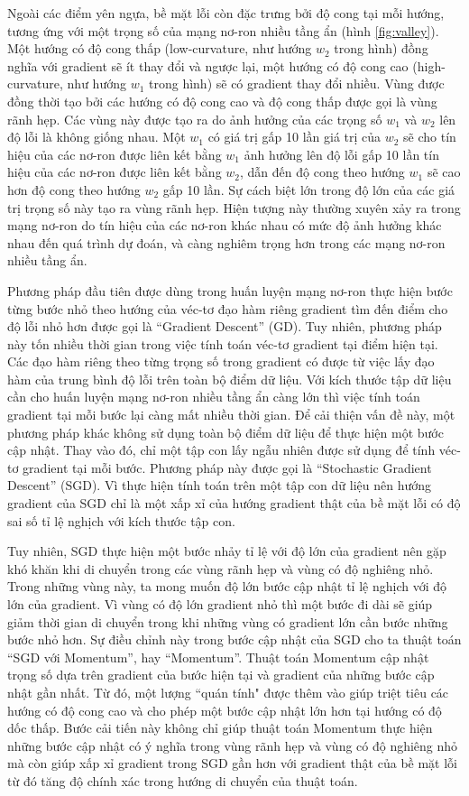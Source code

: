 Ngoài các điểm yên ngựa, bề mặt lỗi còn đặc trưng bởi độ cong tại mỗi hướng, tương ứng với một trọng số của mạng nơ-ron nhiều tầng ẩn (hình \ref{fig:valley}). Một hướng có độ cong thấp (low-curvature, như hướng $w_2$ trong hình) đồng nghĩa với gradient sẽ ít thay đổi và ngược lại, một hướng có độ cong cao (high-curvature, như hướng $w_1$ trong hình) sẽ có gradient thay đổi nhiều. Vùng được đồng thời tạo bởi các hướng có độ cong cao và độ cong thấp được gọi là vùng rãnh hẹp. Các vùng này được tạo ra do ảnh hưởng của các trọng số $w_1$ và $w_2$ lên độ lỗi là không giống nhau. Một $w_1$ có giá trị gấp 10 lần giá trị của $w_2$ sẽ cho tín hiệu của các nơ-ron được liên kết bằng $w_1$ ảnh hưởng lên độ lỗi gấp 10 lần tín hiệu của các nơ-ron được liên kết bằng $w_2$, dẫn đến độ cong theo hướng $w_1$ sẽ cao hơn độ cong theo hướng $w_2$ gấp 10 lần. Sự cách biệt lớn trong độ lớn của các giá trị trọng số này tạo ra vùng rãnh hẹp. Hiện tượng này thường xuyên xảy ra trong mạng nơ-ron do tín hiệu của các nơ-ron khác nhau có mức độ ảnh hưởng khác nhau đến quá trình dự đoán, và càng nghiêm trọng hơn trong các mạng nơ-ron nhiều tầng ẩn.

Phương pháp đầu tiên được dùng trong huấn luyện mạng nơ-ron thực hiện bước từng bước nhỏ theo hướng của véc-tơ đạo hàm riêng gradient tìm đến điểm cho độ lỗi nhỏ hơn được gọi là ``Gradient Descent'' (GD). Tuy nhiên, phương pháp này tốn nhiều thời gian trong việc tính toán véc-tơ gradient tại điểm hiện tại. Các đạo hàm riêng theo từng trọng số trong gradient có được từ việc lấy đạo hàm của trung bình độ lỗi trên toàn bộ điểm dữ liệu. Với kích thước tập dữ liệu cần cho huấn luyện mạng nơ-ron nhiều tầng ẩn càng lớn thì việc tính toán gradient tại mỗi bước lại càng mất nhiều thời gian. Để cải thiện vấn đề này, một phương pháp khác không sử dụng toàn bộ điểm dữ liệu để thực hiện một bước cập nhật. Thay vào đó, chỉ một tập con lấy ngẫu nhiên được sử dụng để tính véc-tơ gradient tại mỗi bước. Phương pháp này được gọi là ``Stochastic Gradient Descent'' (SGD). Vì thực hiện tính toán trên một tập con dữ liệu nên hướng gradient của SGD chỉ là một xấp xỉ của hướng gradient thật của bề mặt lỗi có độ sai số tỉ lệ nghịch với kích thước tập con.

Tuy nhiên, SGD thực hiện một bước nhảy tỉ lệ với độ lớn của gradient nên gặp khó khăn khi di chuyển trong các vùng rãnh hẹp và vùng có độ nghiêng nhỏ. Trong những vùng này, ta mong muốn độ lớn bước cập nhật tỉ lệ nghịch với độ lớn của gradient. Vì vùng có độ lớn gradient nhỏ thì một bước đi dài sẽ giúp giảm thời gian di chuyển trong khi những vùng có gradient lớn cần bước những bước nhỏ hơn. Sự điều chỉnh này trong bước cập nhật của SGD cho ta thuật toán ``SGD với Momentum'', hay ``Momentum''. Thuật toán Momentum cập nhật trọng số dựa trên gradient của bước hiện tại và gradient của những bước cập nhật gần nhất. Từ đó, một lượng ``quán tính" được thêm vào giúp triệt tiêu các hướng có độ cong cao và cho phép một bước cập nhật lớn hơn tại hướng có độ dốc thấp. Bước cải tiến này không chỉ giúp thuật toán Momentum thực hiện những bước cập nhật có ý nghĩa trong vùng rãnh hẹp và vùng có độ nghiêng nhỏ mà còn giúp xấp xỉ gradient trong SGD gần hơn với gradient thật của bề mặt lỗi từ đó tăng độ chính xác trong hướng di chuyển của thuật toán.

